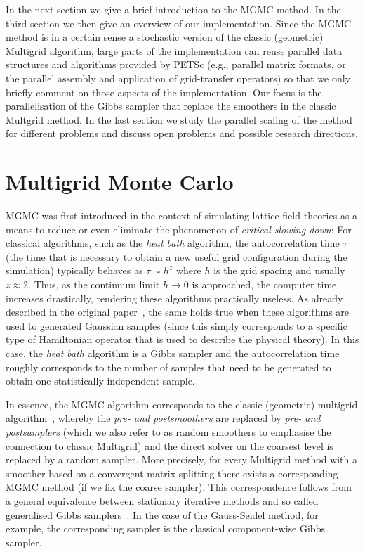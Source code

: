 \documentclass[
fontsize=11pt,
paper=a4,
numbers=noenddot
]{scrartcl}
\begin{document}
In the next section we give a brief introduction to the MGMC method. In the third section we then give an overview of our implementation. Since the MGMC method is in a certain sense a stochastic version of the classic (geometric) Multigrid algorithm, large parts of the implementation can reuse parallel data structures and algorithms provided by PETSc (e.g., parallel matrix formats, or the parallel assembly and application of grid-transfer operators) so that we only briefly comment on those aspects of the implementation. Our focus is the parallelisation of the Gibbs sampler that replace the smoothers in the classic Multgrid method. In the last section we study the parallel scaling of the method for different problems and discuss open problems and possible research directions.

\section{Multigrid Monte Carlo}
MGMC was first introduced in the context of simulating lattice field theories as a means to reduce or even eliminate the phenomenon of \emph{critical slowing down}: For classical algorithms, such as the \emph{heat bath} algorithm, the autocorrelation time $\tau$ (the time that is necessary to obtain a new useful grid configuration during the simulation) typically behaves as $\tau \sim h^z$ where $h$ is the grid spacing and usually $z \approx 2$. Thus, as the continuum limit $h \rightarrow 0$ is approached, the computer time increases drastically, rendering these algorithms practically useless. As already described in the original paper~\cite{goodmansokal}, the same holds true when these algorithms are used to generated Gaussian samples (since this simply corresponds to a specific type of Hamiltonian operator that is used to describe the physical theory). In this case, the \emph{heat bath} algorithm is a Gibbs sampler and the autocorrelation time roughly corresponds to the number of samples that need to be generated to obtain one statistically independent sample.

In essence, the MGMC algorithm corresponds to the classic (geometric) multigrid algorithm~\cite{hackbuschMultiGridMethodsApplications1985}, whereby the \emph{pre- and postsmoothers} are replaced by \emph{pre- and postsamplers} (which we also refer to as random smoothers to emphasise the connection to classic Multigrid) and the direct solver on the coarsest level is replaced by a random sampler. More precisely, for every Multigrid method with a smoother based on a convergent matrix splitting there exists a corresponding MGMC method (if we fix the coarse sampler). This correspondence follows from a general equivalence between stationary iterative methods and so called generalised Gibbs samplers~\cite{foxparker}. In the case of the Gauss-Seidel method, for example, the corresponding sampler is the classical component-wise Gibbs sampler.
\end{document}
